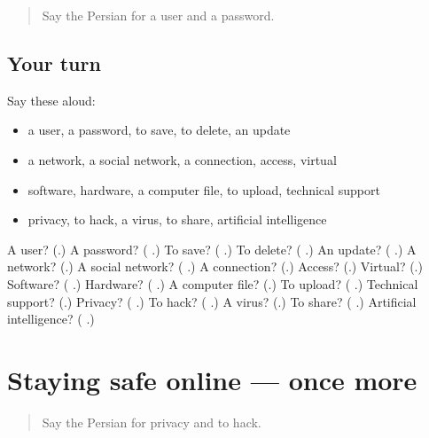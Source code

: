 \label{lesson:FA-R419-review-416-419}



\begin{quote}
Say the Persian for a user and a password.
\end{quote}

\subsection*{Your turn}
Say these aloud:

\begin{itemize}
\raggedright
  \item a user, a password, to save, to delete, an update
  \item a network, a social network, a connection, access, virtual
  \item software, hardware, a computer file, to upload, technical support
  \item privacy, to hack, a virus, to share, artificial intelligence
\end{itemize}

\begin{tcolorbox}[breakable,colback=teal!4,colframe=teal!35!black,title={Before you move on}]
A user? (\textbf{}.) A password? (\textbf{ }.) To save? (\textbf{ }.) To delete? (\textbf{ }.) An update? (\textbf{  }.) A network? (\textbf{}.) A social network? (\textbf{ }.) A connection? (\textbf{}.) Access? (\textbf{}.) Virtual? (\textbf{}.) Software? (\textbf{ }.) Hardware? (\textbf{ }.) A computer file? (\textbf{}.) To upload? (\textbf{ }.) Technical support? (\textbf{}.) Privacy? (\textbf{ }.) To hack? (\textbf{ }.) A virus? (\textbf{}.) To share? (\textbf{  }.) Artificial intelligence? (\textbf{ }.)
\end{tcolorbox}
\section[(dialogue)]{Staying safe online — once more}

\label{lesson:FA-R419-review-final-419}



\begin{quote}
Say the Persian for privacy and to hack.
\end{quote}

